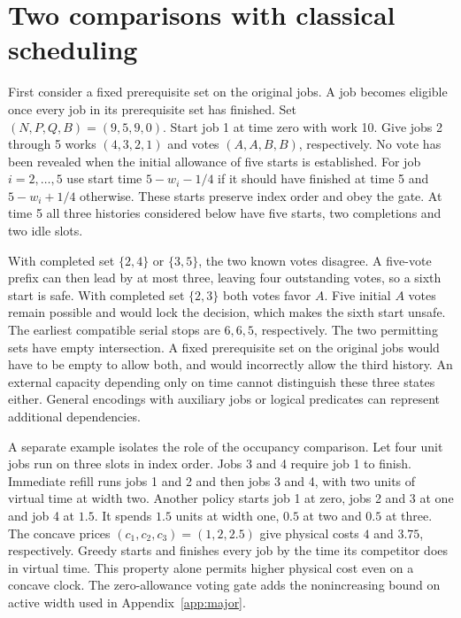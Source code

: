 \section{Two comparisons with classical scheduling}\label{app:precedence}
First consider a fixed prerequisite set on the original jobs. A job becomes eligible once every job in its prerequisite set has finished. Set $(N,P,Q,B)=(9,5,9,0)$. Start job 1 at time zero with work 10. Give jobs 2 through 5 works $(4,3,2,1)$ and votes $(A,A,B,B)$, respectively. No vote has been revealed when the initial allowance of five starts is established. For job $i=2,\ldots,5$ use start time $5-w_i-1/4$ if it should have finished at time 5 and $5-w_i+1/4$ otherwise. These starts preserve index order and obey the gate. At time 5 all three histories considered below have five starts, two completions and two idle slots.

With completed set $\{2,4\}$ or $\{3,5\}$, the two known votes disagree. A five-vote prefix can then lead by at most three, leaving four outstanding votes, so a sixth start is safe. With completed set $\{2,3\}$ both votes favor $A$. Five initial $A$ votes remain possible and would lock the decision, which makes the sixth start unsafe. The earliest compatible serial stops are $6,6,5$, respectively. The two permitting sets have empty intersection. A fixed prerequisite set on the original jobs would have to be empty to allow both, and would incorrectly allow the third history. An external capacity depending only on time cannot distinguish these three states either. General encodings with auxiliary jobs or logical predicates can represent additional dependencies.

A separate example isolates the role of the occupancy comparison. Let four unit jobs run on three slots in index order. Jobs 3 and 4 require job 1 to finish. Immediate refill runs jobs 1 and 2 and then jobs 3 and 4, with two units of virtual time at width two. Another policy starts job 1 at zero, jobs 2 and 3 at one and job 4 at $1.5$. It spends $1.5$ units at width one, $0.5$ at two and $0.5$ at three. The concave prices $(c_1,c_2,c_3)=(1,2,2.5)$ give physical costs $4$ and $3.75$, respectively. Greedy starts and finishes every job by the time its competitor does in virtual time. This property alone permits higher physical cost even on a concave clock. The zero-allowance voting gate adds the nonincreasing bound on active width used in Appendix~\ref{app:major}.

